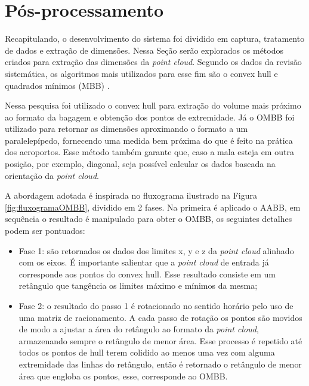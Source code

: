     
    
\section{Pós-processamento}
\label{subsec_Pos-processamento}

    Recapitulando, o desenvolvimento do sistema foi dividido em captura, tratamento de dados e extração de dimensões. Nessa Seção serão explorados os métodos criados para extração das dimensões da \textit{point cloud}. Segundo os dados da revisão sistemática, os algoritmos mais utilizados para esse fim são o convex hull e quadrados mínimos (MBB) \cite{guffanti_2020_the, gao_2018_minimum, chen_2013_research}.
    
    Nessa pesquisa foi utilizado o convex hull para extração do volume mais próximo ao formato da bagagem e obtenção dos pontos de extremidade. Já o OMBB foi utilizado para retornar as dimensões aproximando o formato a um paralelepípedo, fornecendo uma medida bem próxima do que é feito na prática dos aeroportos. Esse método também garante que, caso a mala esteja em outra posição, por exemplo, diagonal, seja possível calcular os dados baseada na orientação da \textit{point cloud}. 
    
    A abordagem adotada é inspirada no fluxograma ilustrado na Figura \ref{fig:fluxogramaOMBB}, dividido em 2 fases. Na primeira é aplicado o AABB, em sequência o resultado é manipulado para obter o OMBB, os seguintes detalhes podem ser pontuados:
    
    \begin{itemize}
    
        \item Fase 1: são retornados os dados dos limites x, y e z da \textit{point cloud} alinhado com os eixos. É importante salientar que a \textit{point cloud} de entrada já corresponde aos pontos do convex hull. Esse resultado consiste em um retângulo que tangência os limites máximo e mínimos da mesma;
        
        \item Fase 2: o resultado do passo 1 é rotacionado no sentido horário pelo uso de uma matriz de racionamento. A cada passo de rotação os pontos são movidos de modo a ajustar a área do retângulo ao formato da \textit{point cloud}, armazenando sempre o retângulo de menor área. Esse processo é repetido até todos os pontos de hull terem colidido ao menos uma vez com alguma extremidade das linhas do retângulo, então é retornado o retângulo de menor área que engloba os pontos, esse, corresponde ao OMBB.
        
    \end{itemize}
    
